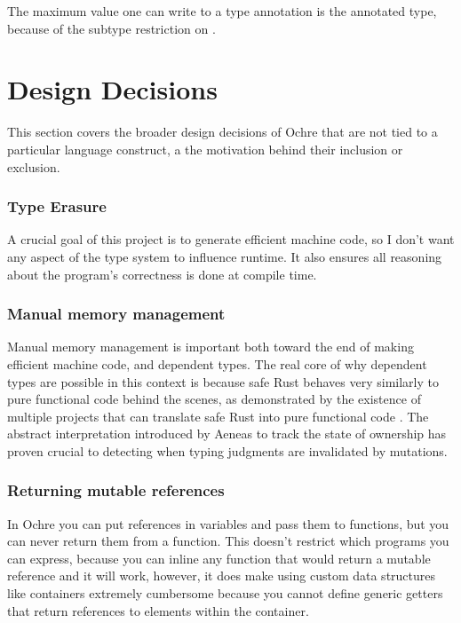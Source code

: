 \documentclass[12pt,twoside]{report}
\begin{document}
The maximum value one can write to a type annotation is the annotated type, because of the subtype restriction on .

\section{Design Decisions}
\label{section:designdecisions}
This section covers the broader design decisions of Ochre that are not tied to a particular language construct, a the motivation behind their inclusion or exclusion.

\subsubsection{Type Erasure}
A crucial goal of this project is to generate efficient machine code, so I don't want any aspect of the type system to influence runtime. It also ensures all reasoning about the program's correctness is done at compile time.

\subsubsection{Manual memory management}
Manual memory management is important both toward the end of making efficient machine code, and dependent types. The real core of why dependent types are possible in this context is because safe Rust behaves very similarly to pure functional code behind the scenes, as demonstrated by the existence of multiple projects that can translate safe Rust into pure functional code \citep{aeneas}\citep{ullrichKhaElectrolysis2024}. The abstract interpretation introduced by Aeneas to track the state of ownership has proven crucial to detecting when typing judgments are invalidated by mutations.

\subsubsection{Returning mutable references}
In Ochre you can put references in variables and pass them to functions, but you can never return them from a function. This doesn't restrict which programs you can express, because you can inline any function that would return a mutable reference and it will work, however, it does make using custom data structures like containers extremely cumbersome because you cannot define generic getters that return references to elements within the container.
\end{document}
